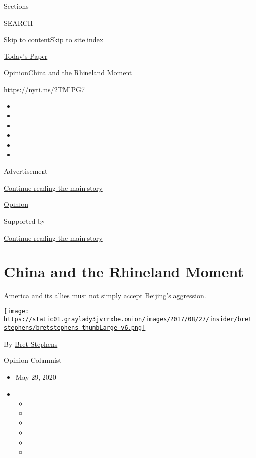 Sections

SEARCH

\protect\hyperlink{site-content}{Skip to
content}\protect\hyperlink{site-index}{Skip to site index}

\href{https://myaccount.nytimes3xbfgragh.onion/auth/login?response_type=cookie\&client_id=vi}{}

\href{https://www.nytimes3xbfgragh.onion/section/todayspaper}{Today's
Paper}

\href{/section/opinion}{Opinion}\textbar{}China and the Rhineland Moment

\url{https://nyti.ms/2TMlPG7}

\begin{itemize}
\item
\item
\item
\item
\item
\item
\end{itemize}

Advertisement

\protect\hyperlink{after-top}{Continue reading the main story}

\href{/section/opinion}{Opinion}

Supported by

\protect\hyperlink{after-sponsor}{Continue reading the main story}

\hypertarget{china-and-the-rhineland-moment}{%
\section{China and the Rhineland
Moment}\label{china-and-the-rhineland-moment}}

America and its allies must not simply accept Beijing's aggression.

\href{https://www.nytimes3xbfgragh.onion/by/bret-stephens}{\texttt{[image: https://static01.graylady3jvrrxbe.onion/images/2017/08/27/insider/bretstephens/bretstephens-thumbLarge-v6.png]}}

By \href{https://www.nytimes3xbfgragh.onion/by/bret-stephens}{Bret
Stephens}

Opinion Columnist

\begin{itemize}
\item
  May 29, 2020
\item
  \begin{itemize}
  \item
  \item
  \item
  \item
  \item
  \item
  \end{itemize}
\end{itemize}

